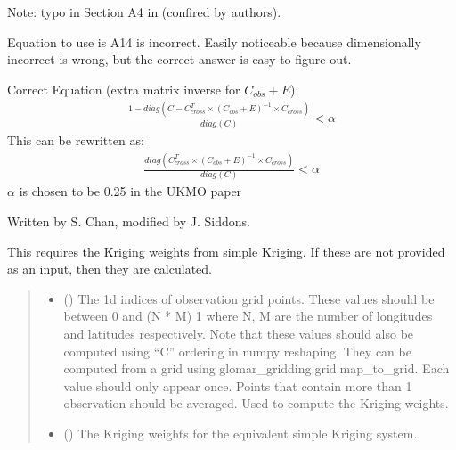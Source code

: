 \documentclass[letterpaper,10pt,english]{sphinxmanual}
\begin{document}
\begin{fulllineitems}
\begin{fulllineitems}
\sphinxAtStartPar
Note: typo in Section A4 in  (confired by authors).

\sphinxAtStartPar
Equation to use is A14 is incorrect. Easily noticeable because
dimensionally incorrect is wrong, but the correct answer is easy to
figure out.

\sphinxAtStartPar
Correct Equation (extra matrix inverse for \(C_{obs} + E\)):
\begin{equation*}
\begin{split}\frac{
    1 - diag(C - C_{cross}^T \times (C_{obs} + E)^{-1}
             \times C_{cross})
}{diag(C)} < \alpha\end{split}
\end{equation*}
\sphinxAtStartPar
This can be re\sphinxhyphen{}written as:
\begin{equation*}
\begin{split}\frac{
    diag(C_{cross}^T \times (C_{obs} + E)^{-1} \times C_{cross})
}{diag(C)} < \alpha\end{split}
\end{equation*}
\sphinxAtStartPar
\(\alpha\) is chosen to be 0.25 in the UKMO paper

\sphinxAtStartPar
Written by S. Chan, modified by J. Siddons.

\sphinxAtStartPar
This requires the Kriging weights from simple Kriging. If these are
not provided as an input, then they are calculated.
\begin{quote}\begin{description}
\begin{itemize}
\item {}
\sphinxAtStartPar
{} () \textendash{} The 1d indices of observation grid points. These values should be
between 0 and (N * M) \sphinxhyphen{} 1 where N, M are the number of longitudes
and latitudes respectively. Note that these values should also be
computed using “C” ordering in numpy reshaping. They can be
computed from a grid using glomar\_gridding.grid.map\_to\_grid. Each
value should only appear once. Points that contain more than 1
observation should be averaged. Used to compute the Kriging weights.

\item {}
\sphinxAtStartPar
{} (\sphinxstyleliteralemphasis{\sphinxupquote{ | }}\sphinxstyleliteralemphasis{\sphinxupquote{,}}) \textendash{} The Kriging weights for the equivalent simple Kriging system.


\end{itemize}
\end{description}
\end{quote}
\end{fulllineitems}
\end{fulllineitems}
\end{document}
